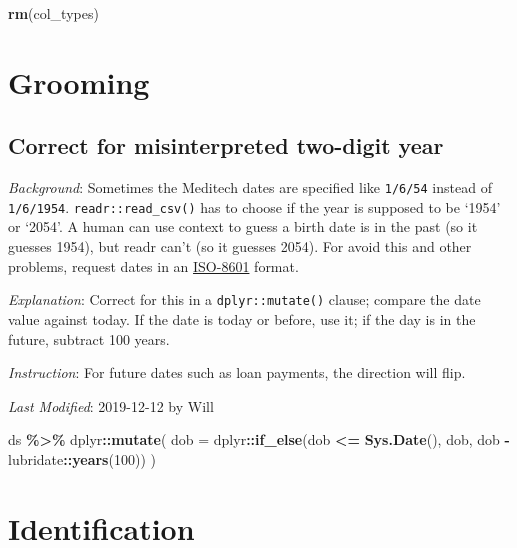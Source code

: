 \documentclass[
]{book}
\newenvironment{Shaded}{\begin{snugshade}}{\end{snugshade}}
\newcommand{\DataTypeTok}[1]{\textcolor[rgb]{0.13,0.29,0.53}{#1}}
\newcommand{\DecValTok}[1]{\textcolor[rgb]{0.00,0.00,0.81}{#1}}
\newcommand{\KeywordTok}[1]{\textcolor[rgb]{0.13,0.29,0.53}{\textbf{#1}}}
\newcommand{\NormalTok}[1]{#1}
\newcommand{\OperatorTok}[1]{\textcolor[rgb]{0.81,0.36,0.00}{\textbf{#1}}}
\newcommand{\StringTok}[1]{\textcolor[rgb]{0.31,0.60,0.02}{#1}}
\begin{document}
\begin{Shaded}
\begin{Highlighting}[]
\KeywordTok{rm}\NormalTok{(col\_types)}
\end{Highlighting}
\end{Shaded}

\hypertarget{snippets-grooming}{%
\section{Grooming}\label{snippets-grooming}}

\hypertarget{snippets-grooming-two-year}{%
\subsection{Correct for misinterpreted two-digit year}\label{snippets-grooming-two-year}}

\emph{Background}: Sometimes the Meditech dates are specified like \texttt{1/6/54} instead of \texttt{1/6/1954}. \texttt{readr::read\_csv()} has to choose if the year is supposed to be `1954' or `2054'. A human can use context to guess a birth date is in the past (so it guesses 1954), but readr can't (so it guesses 2054). For avoid this and other problems, request dates in an \href{https://www.explainxkcd.com/wiki/index.php/1179:_ISO_8601}{ISO-8601} format.

\emph{Explanation}: Correct for this in a \texttt{dplyr::mutate()} clause; compare the date value against today. If the date is today or before, use it; if the day is in the future, subtract 100 years.

\emph{Instruction}: For future dates such as loan payments, the direction will flip.

\emph{Last Modified}: 2019-12-12 by Will

\begin{Shaded}
\begin{Highlighting}[]
\NormalTok{ ds }\OperatorTok{\%\textgreater{}\%}
\StringTok{ }\NormalTok{dplyr}\OperatorTok{::}\KeywordTok{mutate}\NormalTok{(}
    \DataTypeTok{dob =}\NormalTok{ dplyr}\OperatorTok{::}\KeywordTok{if\_else}\NormalTok{(dob }\OperatorTok{\textless{}=}\StringTok{ }\KeywordTok{Sys.Date}\NormalTok{(), dob, dob }\OperatorTok{{-}}\StringTok{ }\NormalTok{lubridate}\OperatorTok{::}\KeywordTok{years}\NormalTok{(}\DecValTok{100}\NormalTok{))}
\NormalTok{  )}
\end{Highlighting}
\end{Shaded}

\hypertarget{snippets-identification}{%
\section{Identification}\label{snippets-identification}}
\end{document}
